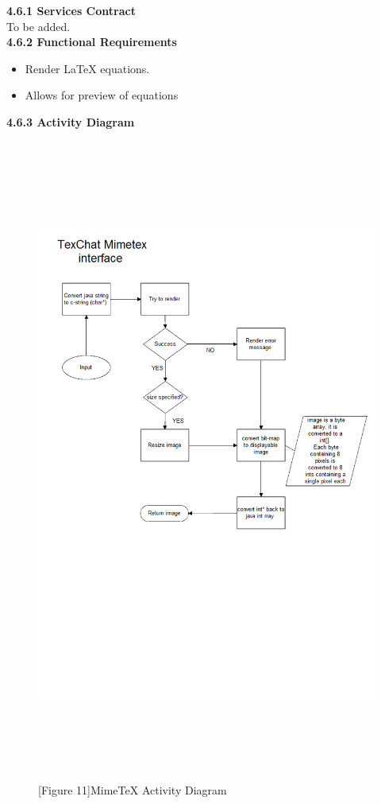 \documentclass[29pt,a4paper]{moderncv}
\begin{document}
		\noindent\textbf{4.6.1 Services Contract}\\ 
		To be added.\\
		\textbf{4.6.2 Functional Requirements}
			\begin{itemize}
				\item Render LaTeX equations.\\
				\item Allows for preview of equations\\
			\end{itemize}
\newpage
		\left\textbf{4.6.3 Activity Diagram}
		\begin{figure}
			\centering
			\\ \includegraphics[width=6.0in, height=8.0in]{./activityMimeTex.png}
			\\\caption{[Figure 11]MimeTeX Activity Diagram}
		\end{figure}
\newpage
\end{document}
